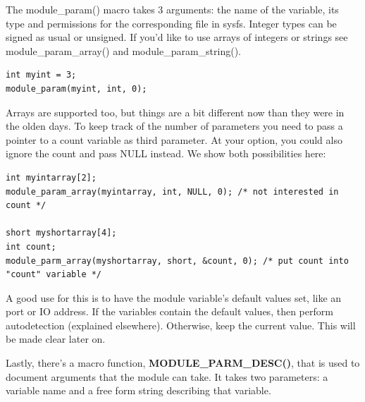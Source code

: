 \documentclass[11pt]{article}
\begin{document}
The module\_param() macro takes 3 arguments: the name of the variable, its type and permissions for the corresponding file in sysfs. Integer types can be signed as usual or unsigned. If you'd like to use arrays of integers or strings see module\_param\_array() and module\_param\_string().

\begin{verbatim}
int myint = 3;
module_param(myint, int, 0);
\end{verbatim}

Arrays are supported too, but things are a bit different now than they were in the olden days. To keep track of the number of parameters you need to pass a pointer to a count variable as third parameter. At your option, you could also ignore the count and pass NULL instead. We show both possibilities here:

\begin{verbatim}
int myintarray[2];
module_param_array(myintarray, int, NULL, 0); /* not interested in count */

short myshortarray[4];
int count;
module_parm_array(myshortarray, short, &count, 0); /* put count into "count" variable */
\end{verbatim}

A good use for this is to have the module variable's default values set, like an port or IO address. If the variables contain the default values, then perform autodetection (explained elsewhere). Otherwise, keep the current value. This will be made clear later on.

Lastly, there's a macro function, \textbf{MODULE\_PARM\_DESC()}, that is used to document arguments that the module can take. It takes two parameters: a variable name and a free form string describing that variable.
\end{document}
